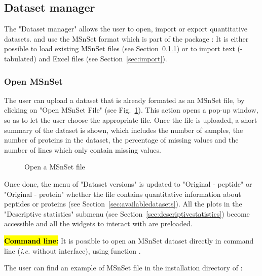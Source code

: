 \documentclass[12pt]{article}
\begin{document}
\subsection{Dataset manager}
The "Dataset manager" allows the user to open, import or export quantitative datasets.  and  use the MSnSet format which is part of the package :
It is either possible to load existing MSnSet files (see Section~\ref{sec:load}) or to import text (-tabulated) and Excel files (see Section~\ref{sec:import}).


\subsubsection{Open MSnSet} \label{sec:load}
The user can upload a dataset that is already formated as an MSnSet file, by clicking on "Open MSnSet File" (see Fig.~\ref{fig:open}). This action opens a pop-up window, so as to let the user choose the appropriate file. Once the file is uploaded, a short summary of the dataset is shown, which includes the number of samples, the number of proteins in the dataset, the percentage of missing values and the number of lines which only contain missing values.\newline
\begin {figure}
\centering
{}
\caption{Open a MSnSet file}\label{fig:open}
\end {figure}
{Once done, the menu of "Dataset versions" is updated to "Original - peptide" or "Original - protein" whether the file contains quantitative information about peptides or proteins (see Section~\ref{sec:availabledatasets}).} All the plots in the "Descriptive statistics" submenu (see Section~\ref{sec:descriptivestatistics}) become accessible and all the widgets to interact with  are preloaded.

\hl{\bf Command line:} It is possible to open an MSnSet dataset directly in command line (\emph{i.e.} without  interface), using function .

{The user can find an example of MSnSet file in the installation directory of :\newline
{}}
% 
\end{document}
